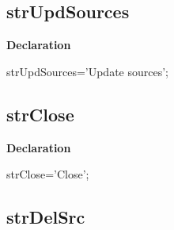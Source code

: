 \documentclass{report}
\newif\ifpdf
\begin{document}
\subsection*{strUpdSources}
\fi
\label{trstrings-strUpdSources}
\begin{list}{}{
\setlength{\itemindent}{0cm}
\setlength{\listparindent}{0cm}
\setlength{\leftmargin}{\evensidemargin}
\addtolength{\leftmargin}{\tmplength}
\settowidth{\labelsep}{X}
\addtolength{\leftmargin}{\labelsep}
\setlength{\labelwidth}{\tmplength}
}
\item[\textbf{Declaration}\hfill]
\ifpdf
\begin{flushleft}
\fi
\begin{ttfamily}
strUpdSources='Update sources';\end{ttfamily}

\ifpdf
\end{flushleft}
\fi

\end{list}
\ifpdf
\subsection*{\large{\textbf{strClose}}\normalsize\hspace{1ex}\hrulefill}
\else
\subsection*{strClose}
\fi
\label{trstrings-strClose}
\begin{list}{}{
\setlength{\itemindent}{0cm}
\setlength{\listparindent}{0cm}
\setlength{\leftmargin}{\evensidemargin}
\addtolength{\leftmargin}{\tmplength}
\settowidth{\labelsep}{X}
\addtolength{\leftmargin}{\labelsep}
\setlength{\labelwidth}{\tmplength}
}
\item[\textbf{Declaration}\hfill]
\ifpdf
\begin{flushleft}
\fi
\begin{ttfamily}
strClose='Close';\end{ttfamily}

\ifpdf
\end{flushleft}
\fi

\end{list}
\ifpdf
\subsection*{\large{\textbf{strDelSrc}}\normalsize\hspace{1ex}\hrulefill}
\else
\end{document}
